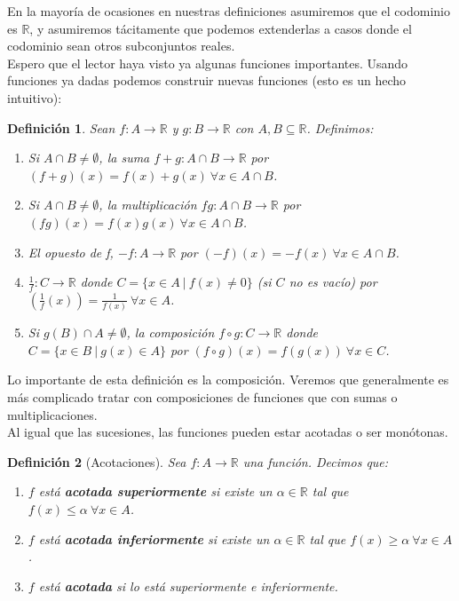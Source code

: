 \documentclass{article}
\newtheorem{define}{Definición}
\newcommand{\reales}{\mathbb{R}}
\begin{document}
En la mayoría de ocasiones en nuestras definiciones asumiremos que el codominio es $\reales$, y asumiremos tácitamente que podemos extenderlas a casos donde el codominio sean otros subconjuntos reales.\\ 
Espero que el lector haya visto ya algunas funciones importantes. Usando funciones ya dadas podemos construir nuevas funciones (esto es un hecho intuitivo):
\begin{define}
	Sean $f:A \rightarrow \reales$ y $g:B \rightarrow \reales$ con $A,B \subseteq \reales$. Definimos:
	\begin{enumerate}
		\item
		Si $A \cap B \neq \emptyset$, la suma $f + g : A \cap B \rightarrow \reales$ por $(f + g)(x) = f(x) + g(x)\ \forall x \in A \cap B$.
		\item
		Si $A \cap B \neq \emptyset$, la multiplicación $fg : A \cap B \rightarrow \reales$ por $(fg)(x) = f(x)g(x)\ \forall x \in A \cap B$.
		\item
		El opuesto de f, $-f: A \rightarrow \reales$ por $(-f)(x) = -f(x)\ \forall x \in A \cap B$.
		\item
		$\frac{1}{f}: C \rightarrow \reales$ donde $C = \{x \in A\ |\ f(x) \neq 0\}$ (si $C$ no es vacío) por $(\frac{1}{f}(x)) = \frac{1}{f(x)}\ \forall x \in A$.
		\item
		Si $g(B) \cap A \neq \emptyset$, la composición $f \circ g : C \rightarrow \reales$ donde $C = \{x \in B\ |\ g(x) \in A\}$ por $(f \circ g)(x) = f(g(x))\ \forall x \in C$.
	\end{enumerate}
\end{define}
Lo importante de esta definición es la composición. Veremos que generalmente es más complicado tratar con composiciones de funciones que con sumas o multiplicaciones.\\
Al igual que las sucesiones, las funciones pueden estar acotadas o ser monótonas.
\begin{define}[Acotaciones]
	Sea $f:A \rightarrow \reales$ una función. Decimos que:
	\begin{enumerate}
		\item
		$f$ está \textbf{acotada superiormente} si existe un $\alpha \in \reales$ tal que $f(x) \leq \alpha\ \forall x \in A$.
		\item
		$f$ está \textbf{acotada inferiormente} si existe un $\alpha \in \reales$ tal que $f(x) \geq \alpha\ \forall x \in A$.
		\item
		$f$ está \textbf{acotada} si lo está superiormente e inferiormente.
	\end{enumerate}
\end{define}
\end{document}
